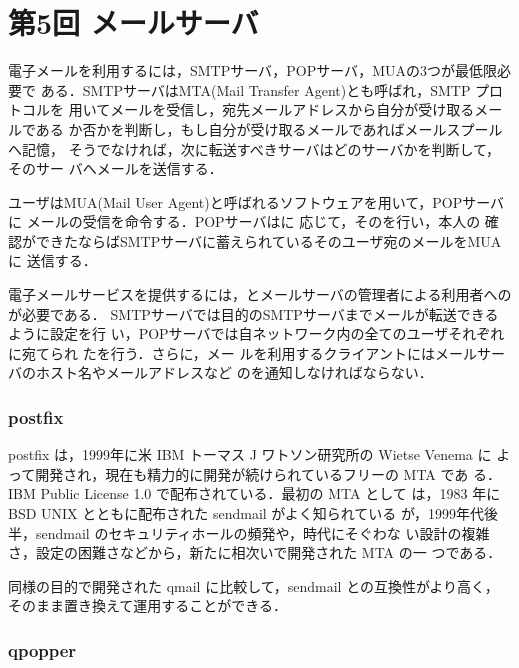 \section{第5回 メールサーバ}

電子メールを利用するには，SMTPサーバ，POPサーバ，MUAの3つが最低限必要で
ある．SMTPサーバはMTA(Mail Transfer Agent)とも呼ばれ，SMTP プロトコルを
用いてメールを受信し，宛先メールアドレスから自分が受け取るメールである
か否かを判断し，もし自分が受け取るメールであればメールスプールへ記憶，
そうでなければ，次に転送すべきサーバはどのサーバかを判断して，そのサー
バへメールを送信する．

ユーザはMUA(Mail User Agent)と呼ばれるソフトウェアを用いて，POPサーバに
メールの受信を命令する．POPサーバは\textbf{}に
応じて，その\textbf{}を行い，本人の
確認ができたならばSMTPサーバに蓄えられているそのユーザ宛のメールをMUAに
送信する．

電子メールサービスを提供するには，\textbf{}とメールサーバの管理者による利用者への\textbf{}が必要である．
SMTPサーバでは目的のSMTPサーバまでメールが転送できるように設定を行
い，POPサーバでは自ネットワーク内の全てのユーザそれぞれに宛てられ
た\textbf{}を行う．さらに，メー
ルを利用するクライアントにはメールサーバのホスト名やメールアドレスなど
の\textbf{}を通知しなければならない．

\subsubsection*{postfix}

postfix は，1999年に米 IBM トーマス J ワトソン研究所の Wietse Venema に
よって開発され，現在も精力的に開発が続けられているフリーの MTA であ
る．IBM Public License 1.0 で配布されている．最初の MTA として
は，1983 年に BSD UNIX とともに配布された sendmail がよく知られている
が，1999年代後半，sendmail のセキュリティホールの頻発や，時代にそぐわな
い設計の複雑さ，設定の困難さなどから，新たに相次いで開発された MTA の一
つである．

同様の目的で開発された qmail に比較して，sendmail との互換性がより高く，
そのまま置き換えて運用することができる．

\subsubsection*{qpopper}

